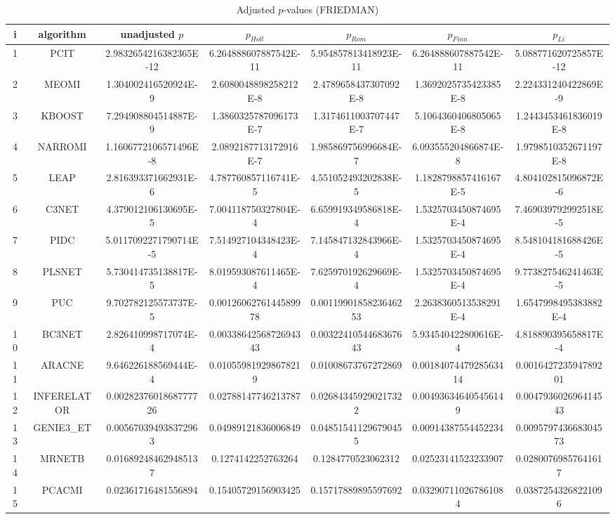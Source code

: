 \documentclass[a4paper,10pt]{article}
\begin{document}
\begin{landscape}
\begin{table}[!htp]
\centering\scriptsize
\caption{Adjusted $p$-values (FRIEDMAN)}
\begin{tabular}{ccccccc}
i&algorithm&unadjusted $p$&$p_{Holl}$&$p_{Rom}$&$p_{Finn}$&$p_{Li}$\\
\hline
1&PCIT&2.9832654216382365E-12&6.264888607887542E-11&5.954857813418923E-11&6.264888607887542E-11&5.088771620725857E-12\\
2&MEOMI&1.304002416520924E-9&2.6080048898258212E-8&2.4789658437307092E-8&1.3692025735423385E-8&2.224331240422869E-9\\
3&KBOOST&7.294908804514887E-9&1.3860325787096173E-7&1.3174611003707447E-7&5.1064360406805065E-8&1.2443453461836019E-8\\
4&NARROMI&1.1606772106571496E-8&2.0892187713172916E-7&1.985869756996684E-7&6.093555204866874E-8&1.9798510352671197E-8\\
5&LEAP&2.816393371662931E-6&4.787760857116741E-5&4.551052493202838E-5&1.1828798857416167E-5&4.804102815096872E-6\\
6&C3NET&4.379012106130695E-5&7.004118750327804E-4&6.659919349586818E-4&1.5325703450874695E-4&7.469039792992518E-5\\
7&PIDC&5.0117092271790714E-5&7.514927104348423E-4&7.145847132843966E-4&1.5325703450874695E-4&8.548104181688426E-5\\
8&PLSNET&5.730414735138817E-5&8.019593087611465E-4&7.625970192629669E-4&1.5325703450874695E-4&9.773827546241463E-5\\
9&PUC&9.702782125573737E-5&0.0012606276144589978&0.0011990185823646253&2.2638360513538291E-4&1.6547998495383882E-4\\
10&BC3NET&2.826410998717074E-4&0.0033864256872694343&0.0032241054468367643&5.934540422800616E-4&4.818890395658817E-4\\
11&ARACNE&9.646226188569444E-4&0.010559819298678219&0.01008673767272869&0.0018407447928563414&0.001642723594789201\\
12&INFERELATOR&0.0028237601868777726&0.02788147746213787&0.026843459290217322&0.004936346405456149&0.004793602696414543\\
13&GENIE3_ET&0.005670394938372963&0.04989121836006849&0.048515411296790455&0.00914387554452234&0.009579743668304573\\
14&MRNETB&0.016892484629485137&0.1274142252763264&0.1284770523062312&0.02523141523233907&0.02800769857641617\\
15&PCACMI&0.02361716481556894&0.15405729156903425&0.15717889895597692&0.032907110267861084&0.03872543268221096\\

\end{tabular}
\end{table}
\end{landscape}
\end{document}
